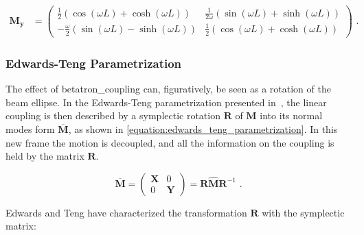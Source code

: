 \begin{equation}
\begin{aligned}
        \mathbf{M_y} &= \begin{pmatrix}
            \frac{1}{2} \left( \cos \left(\omega L\right) + \cosh \left(\omega L\right)\right)              &  \frac{1}{2 \omega} \left( \sin \left(\omega L\right) + \sinh \left(\omega L\right)\right) \\
            -\frac{\omega}{2} \left( \sin \left(\omega L\right) - \sinh \left(\omega L\right)\right)  &  \frac{1}{2} \left( \cos \left(\omega L\right) + \cosh \left(\omega L\right)\right)
        \end{pmatrix} \text{ .}
    \end{aligned}
    \label{equation:skew_quad_transfer_matrix_sub_matrices}
\end{equation}

\subsubsection*{Edwards-Teng Parametrization}

The effect of \gls{betatron_coupling} can, figuratively, be seen as a rotation of the beam ellipse.
In the Edwards-Teng parametrization presented in~\cite{IEEE:Edwards:Parametrization_Linear_Coupled_Motion}, the linear coupling is then described by a symplectic rotation \(\mathbf{R}\) of \(\hat{\mathbf{M}}\) into its normal modes form \(\overline{\mathbf{M}}\), as shown in \cref{equation:edwards_teng_parametrization}.
In this new frame the motion is decoupled, and all the information on the coupling is held by the matrix \(\mathbf{R}\).

\begin{equation}
    \overline{\mathbf{M}} = \left(
        \begin{array}{cc}
            \mathbf{X} & 0 \\
            0 & \mathbf{Y}
    \end{array} \right) = \mathbf{R} \hat{\mathbf{M}} \mathbf{R}^{-1} \text{ .}
    \label{equation:edwards_teng_parametrization}
\end{equation}

Edwards and Teng have characterized the transformation \(\mathbf{R}\) with the symplectic matrix:

